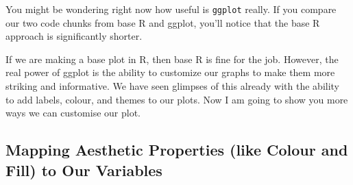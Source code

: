\documentclass[
]{book}
\newenvironment{Shaded}{\begin{snugshade}}{\end{snugshade}}
\newcommand{\AttributeTok}[1]{\textcolor[rgb]{0.13,0.29,0.53}{#1}}
\newcommand{\CommentTok}[1]{\textcolor[rgb]{0.56,0.35,0.01}{\textit{#1}}}
\newcommand{\DecValTok}[1]{\textcolor[rgb]{0.00,0.00,0.81}{#1}}
\newcommand{\FunctionTok}[1]{\textcolor[rgb]{0.13,0.29,0.53}{\textbf{#1}}}
\newcommand{\NormalTok}[1]{#1}
\newcommand{\SpecialCharTok}[1]{\textcolor[rgb]{0.81,0.36,0.00}{\textbf{#1}}}
\newcommand{\StringTok}[1]{\textcolor[rgb]{0.31,0.60,0.02}{#1}}
\begin{document}
You might be wondering right now how useful is \texttt{ggplot} really. If you compare our two code chunks from base R and ggplot, you'll notice that the base R approach is significantly shorter.

\begin{Shaded}
\end{Shaded}

If we are making a base plot in R, then base R is fine for the job. However, the real power of ggplot is the ability to customize our graphs to make them more striking and informative. We have seen glimpses of this already with the ability to add labels, colour, and themes to our plots. Now I am going to show you more ways we can customise our plot.

\hypertarget{mapping-aesthetic-properties-like-colour-and-fill-to-our-variables}{%
\subsection{Mapping Aesthetic Properties (like Colour and Fill) to Our Variables}\label{mapping-aesthetic-properties-like-colour-and-fill-to-our-variables}}
\end{document}
